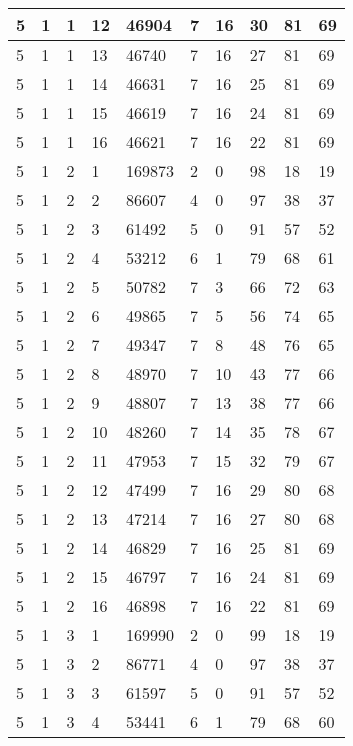 \begin{table}[!ht]
\begin{tabular}{|l|l|l|l|l|l|l|l|l|l|}
        5 & 1 & 1 & 12 & 46904 & 7 & 16 & 30 & 81 & 69 \\ \hline
        5 & 1 & 1 & 13 & 46740 & 7 & 16 & 27 & 81 & 69 \\ \hline
        5 & 1 & 1 & 14 & 46631 & 7 & 16 & 25 & 81 & 69 \\ \hline
        5 & 1 & 1 & 15 & 46619 & 7 & 16 & 24 & 81 & 69 \\ \hline
        5 & 1 & 1 & 16 & 46621 & 7 & 16 & 22 & 81 & 69 \\ \hline
        5 & 1 & 2 & 1 & 169873 & 2 & 0 & 98 & 18 & 19 \\ \hline
        5 & 1 & 2 & 2 & 86607 & 4 & 0 & 97 & 38 & 37 \\ \hline
        5 & 1 & 2 & 3 & 61492 & 5 & 0 & 91 & 57 & 52 \\ \hline
        5 & 1 & 2 & 4 & 53212 & 6 & 1 & 79 & 68 & 61 \\ \hline
        5 & 1 & 2 & 5 & 50782 & 7 & 3 & 66 & 72 & 63 \\ \hline
        5 & 1 & 2 & 6 & 49865 & 7 & 5 & 56 & 74 & 65 \\ \hline
        5 & 1 & 2 & 7 & 49347 & 7 & 8 & 48 & 76 & 65 \\ \hline
        5 & 1 & 2 & 8 & 48970 & 7 & 10 & 43 & 77 & 66 \\ \hline
        5 & 1 & 2 & 9 & 48807 & 7 & 13 & 38 & 77 & 66 \\ \hline
        5 & 1 & 2 & 10 & 48260 & 7 & 14 & 35 & 78 & 67 \\ \hline
        5 & 1 & 2 & 11 & 47953 & 7 & 15 & 32 & 79 & 67 \\ \hline
        5 & 1 & 2 & 12 & 47499 & 7 & 16 & 29 & 80 & 68 \\ \hline
        5 & 1 & 2 & 13 & 47214 & 7 & 16 & 27 & 80 & 68 \\ \hline
        5 & 1 & 2 & 14 & 46829 & 7 & 16 & 25 & 81 & 69 \\ \hline
        5 & 1 & 2 & 15 & 46797 & 7 & 16 & 24 & 81 & 69 \\ \hline
        5 & 1 & 2 & 16 & 46898 & 7 & 16 & 22 & 81 & 69 \\ \hline
        5 & 1 & 3 & 1 & 169990 & 2 & 0 & 99 & 18 & 19 \\ \hline
        5 & 1 & 3 & 2 & 86771 & 4 & 0 & 97 & 38 & 37 \\ \hline
        5 & 1 & 3 & 3 & 61597 & 5 & 0 & 91 & 57 & 52 \\ \hline
        5 & 1 & 3 & 4 & 53441 & 6 & 1 & 79 & 68 & 60 \\ \hline

\end{tabular}
\end{table}

